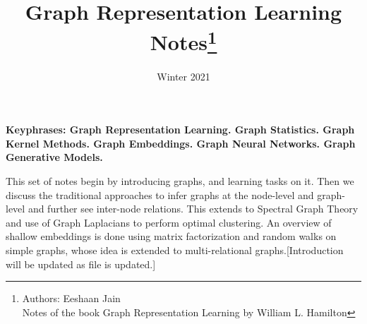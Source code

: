 \documentclass[nobib]{tufte-handout}
\title{Graph Representation Learning\\
       \Large Notes\thanks{Authors: Eeshaan Jain \\ Notes of the book Graph Representation Learning by William L. Hamilton}}
\date{Winter 2021} %
\newtheorem[M]{definition}{Definition}[section]
\begin{document}
\maketitle%



\textbf{Keyphrases: Graph Representation Learning. Graph Statistics. Graph Kernel Methods. Graph Embeddings. Graph Neural Networks. Graph Generative Models.}

This set of notes begin by introducing graphs, and learning tasks on it. Then we discuss the traditional approaches to infer graphs at the node-level and graph-level and further see inter-node relations. This extends to Spectral Graph Theory and use of Graph Laplacians to perform optimal clustering. An overview of shallow embeddings is done using matrix factorization and random walks on simple graphs, whose idea is extended to multi-relational graphs.[Introduction will be updated as file is updated.]
\tableofcontents






\nocite{*}
\footnotesize


\end{document}
